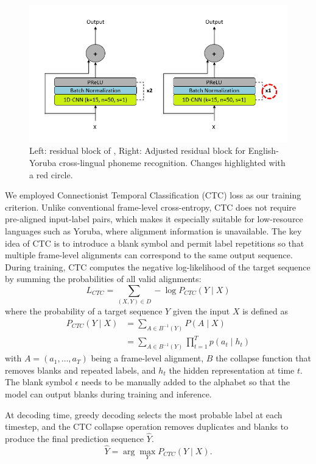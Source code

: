\documentclass[11pt]{article}
\begin{document}
{\begin{figure}
    \centering
    \includegraphics[width=1\linewidth]{residualblock.PNG}
    \caption{Left: residual block of \cite{dhakal2022automatic}, Right: Adjusted residual block for English-Yoruba cross-lingual phoneme recognition. Changes highlighted with a red circle.}
    \label{fig:residualblock}
\end{figure}

We employed Connectionist Temporal Classification (CTC) loss as our training criterion. Unlike conventional frame-level cross-entropy, CTC does not require pre-aligned input-label pairs, which makes it especially suitable for low-resource languages such as Yoruba, where alignment information is unavailable. The key idea of CTC is to introduce a blank symbol and permit label repetitions so that multiple frame-level alignments can correspond to the same output sequence. During training, CTC computes the negative log-likelihood of the target sequence by summing the probabilities of all valid alignments:
$$L_{CTC} = \sum_{(X, Y) \in D} - \log P_{CTC}(Y \mid X)$$
where the probability of a target sequence $Y$ given the input $X$ is defined as
\[
\begin{aligned}
P_{CTC}(Y \mid X) &= \sum_{A \in B^{-1}(Y)} P(A \mid X) \\
                  &= \sum_{A \in B^{-1}(Y)} \prod_{t=1}^{T} p(a_t \mid h_t)
\end{aligned}
\]
with $A=(a_1, \dots, a_T)$ being a frame-level alignment, $B$ the collapse function that removes blanks and repeated labels, and $h_t$ the hidden representation at time $t$. The blank symbol $\epsilon$ needs to be manually added to the alphabet so that the model can output blanks during training and inference.

At decoding time, greedy decoding selects the most probable label at each timestep, and the CTC collapse operation removes duplicates and blanks to produce the final prediction sequence $\hat{Y}$.
$$\hat{Y} = \arg\max_{Y} P_{CTC}(Y \mid X).$$

}
\end{document}
